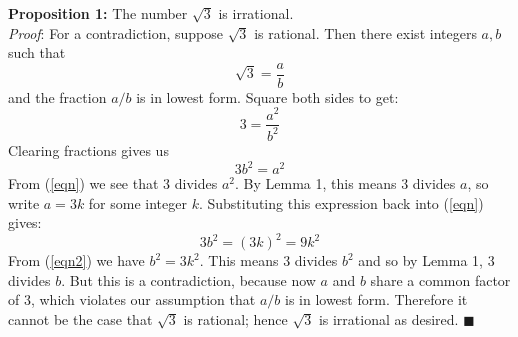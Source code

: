 \documentclass[11pt]{article}
\begin{document}
\bigskip

\noindent
\textbf{Proposition 1:} The number $\sqrt{3}$ is irrational. \\

\noindent
\emph{Proof}: For a contradiction, suppose $\sqrt{3}$ is rational. Then there exist integers $a,b$ such that 
\[ \sqrt{3} = \frac{a}{b} \]
and the fraction $a/b$ is in lowest form. Square both sides to get: 
\[ 3 = \frac{a^2}{b^2} \]
Clearing fractions gives us 
\begin{equation}\label{eqn}
	3b^2 = a^2
\end{equation}
From (\ref{eqn}) we see that $3$ divides $a^2$. By Lemma 1, this means $3$ divides $a$, so write $a = 3k$ for some integer $k$. Substituting this expression back into (\ref{eqn}) gives: 
\begin{equation}\label{eqn2}
	3b^2 = (3k)^2 = 9k^2
\end{equation}
From (\ref{eqn2}) we have $b^2 = 3k^2$. This means $3$ divides $b^2$ and so by Lemma 1, $3$ divides $b$. But this is a contradiction, because now $a$ and $b$ share a common factor of $3$, which violates our assumption that $a/b$ is in lowest form. Therefore it cannot be the case that $\sqrt{3}$ is rational; hence $\sqrt{3}$ is irrational as desired. \hfill $\blacksquare$
\end{document}

